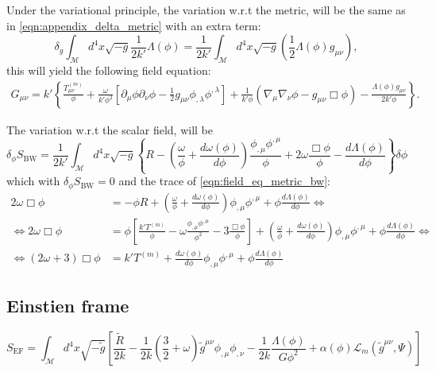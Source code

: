 Under the variational principle, the variation w.r.t the metric, will be the same as in \cref{eqn:appendix_delta_metric} with an extra term:
\begin{equation}
    \delta_g \int_{\mathcal{M}}d^4x\sqrt{-g}\frac{1}{2k'}\Lambda(\phi) = \frac{1}{2k'}\int_{\mathcal{M}}d^4x\sqrt{-g}\left(\frac{1}{2}\Lambda(\phi)g_{\mu\nu}\right),
\end{equation}
this will yield the following field equation:
\begin{align}
G_{\mu\nu}=k'\left\{\frac{T_{\mu\nu}^{(m)}}{\phi}+\frac{\omega}{k'\phi^2}\left[\partial_\mu \phi \partial_\nu \phi-\frac{1}{2}g_{\mu\nu}\phi_{,\lambda}\phi^{,\lambda}\right]+\frac{1}{k'\phi}\left(\nabla_\mu\nabla_\nu\phi-g_{\mu\nu}\Box\phi\right)-\frac{\Lambda(\phi)g_{\mu\nu}}{2k'\phi}\right\}.
\label{eqn:field_eq_metric_bw}
\end{align}

The variation w.r.t the scalar field, will be
\begin{equation}
    \delta_\phi S_{\mathrm{BW}}=\frac{1}{2k'}\int_{\mathcal{M}} d^4x\sqrt{-g}\left\{ R-\left(\frac{\omega}{\phi}+\frac{d\omega(\phi)}{d\phi}\right)\frac{\phi_{,\mu}\phi^{,\mu}}{\phi}+2\omega\frac{\Box\phi}{\phi}-\frac{d\Lambda(\phi)}{d\phi}\right\}\delta\phi
    \label{eqn:delta_phi_bw}
\end{equation}
which with $\delta_\phi S_{\mathrm{BW}}=0$ and the trace of \cref{eqn:field_eq_metric_bw}:
\begin{align}
    2\omega\Box\phi&=-\phi R+\left(\frac{\omega}{\phi}+\frac{d\omega(\phi)}{d\phi}\right)\phi_{,\mu}\phi^{,\mu}+\phi\frac{d\Lambda(\phi)}{d\phi}\Leftrightarrow\nonumber\\
    \Leftrightarrow 2\omega\Box\phi&=\phi\left[\frac{k'T^{(m)}}{\phi}-\omega\frac{\phi_{,\mu}\phi^{,\mu}}{\phi^2}-3\frac{\Box\phi}{\phi}\right]+\left(\frac{\omega}{\phi}+\frac{d\omega(\phi)}{d\phi}\right)\phi_{,\mu}\phi^{,\mu}+\phi\frac{d\Lambda(\phi)}{d\phi}\Leftrightarrow\nonumber\\
    \Leftrightarrow (2\omega+3)\Box\phi &=k' T^{(m)}+\frac{d\omega(\phi)}{d\phi}\phi_{,\mu}\phi^{,\mu}+\phi\frac{d\Lambda(\phi)}{d\phi}
\end{align}


\subsection{Einstien frame}

\begin{equation}
    S_{\text{EF}}=\int_{\mathcal{M}}d^4x \sqrt{-\tilde{g}}\left[\frac{\tilde{R}}{2k}-\frac{1}{2k}\left(\frac{3}{2}+\omega\right)\tilde{g}^{\mu\nu}\phi_{,\mu}\phi_{,\nu}-\frac{1}{2k}\frac{\Lambda(\phi)}{G\phi^2}+\alpha(\phi)\mathcal{L}_m(\tilde{g}^{\mu\nu},\Psi)\right]
\end{equation}



